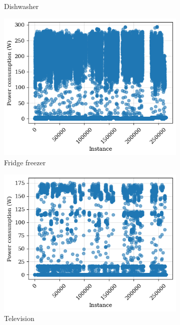 \begin{figure}
\begin{subfigure}{.5\textwidth}
      \caption{Dishwasher}
      \label{fig:dish_washer}
    \end{subfigure}
    \begin{subfigure}{.5\textwidth}
      \centering
      \includegraphics[width=.9\linewidth]{images/raw_consumptions/fridge.png}
      \caption{Fridge freezer}
      \label{fig:fridge_freezer}
    \end{subfigure}%
    \begin{subfigure}{.5\textwidth}
      \centering
      \includegraphics[width=.9\linewidth]{images/raw_consumptions/television.png}
      \caption{Television}
      \label{fig:television}
    \end{subfigure}
    \begin{subfigure}{.5\textwidth}
      \centering

\end{subfigure}
\end{figure}
